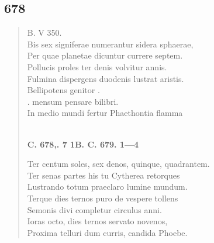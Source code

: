 \documentclass[11pt, a4paper]{report}
\begin{document}
            \subsection*{678}
      \begin{verse}
      B. V 350. \\ Bis sex signiferae numerantur sidera sphaerae, \\ Per quae planetae dicuntur currere septem. \\ Pollucis proles ter denis volvitur annis. \\ Fulmina dispergens duodenis lustrat aristis. \\ Bellipotens genitor . \\ . mensum pensare bilibri. \\ In medio mundi fertur Phaethontia flamma \\ 
        ﻿\pagebreak 
    \begin{center} \textbf{C. 678,. 7 1B. C. 679. 1—4} \end{center} \marginpar{[154]} Ter centum soles, sex denos, quinque, quadrantem. \\ Ter senas partes his  \lbrack tu \rbrack  Cytherea retorques \\ Lustrando totum praeclaro lumine mundum. \\ Terque dies ternos puro de vespere tollens \\ Semonis divi completur circulus anni. \\ Ioras octo, dies ternos servato novenos, \\ Proxima telluri dum curris, candida Phoebe. \\ 
      \end{verse}
  
\end{document}
